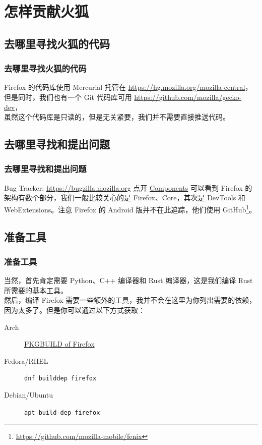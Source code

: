 \documentclass[UTF-8]{ctexbeamer}
\newcommand{\emptyline}{\vspace{\baselineskip}}
\begin{document}
\section{怎样贡献火狐}

\subsection{去哪里寻找火狐的代码}
\begin{frame}
	\frametitle{去哪里寻找火狐的代码}

	Firefox 的代码库使用 Mercurial 托管在 \url{https://hg.mozilla.org/mozilla-central}，\\
	但是同时，我们也有一个 Git 代码库可用 \url{https://github.com/mozilla/gecko-dev}，\\
	虽然这个代码库是只读的，但是无关紧要，我们并不需要直接推送代码。

\end{frame}

\subsection{去哪里寻找和提出问题}
\begin{frame}[fragile]
	\frametitle{去哪里寻找和提出问题}

	Bug Tracker: \url{https://bugzilla.mozilla.org}
	\pause
	\emptyline
	点开 \href{https://bugzilla.mozilla.org/describecomponents.cgi}{Components} 可以看到 Firefox 的架构有数个部分，我们一般比较关心的是 Firefox、Core，其次是 DevTools 和 WebExtensions。注意 Firefox 的 Android 版并不在此追踪，他们使用 GitHub\footnote{\url{https://github.com/mozilla-mobile/fenix}}。

\end{frame}

\subsection{准备工具}
\begin{frame}[fragile]
	\frametitle{准备工具}

	当然，首先肯定需要 Python、C++ 编译器和 Rust 编译器，这是我们编译 Rust 所需要的基本工具。\\
	\pause
	然后，编译 Firefox 需要一些额外的工具，我并不会在这里为你列出需要的依赖，因为太多了。但是你可以通过以下方式获取：\\
	\pause
	\begin{description}
		\item[Arch] \href{https://github.com/archlinux/svntogit-packages/blob/packages/firefox/trunk/PKGBUILD#L13}{PKGBUILD of Firefox}
		\item[Fedora/RHEL] \verb|dnf builddep firefox|
		\item[Debian/Ubuntu] \verb|apt build-dep firefox|
	\end{description}
\end{frame}
\end{document}
